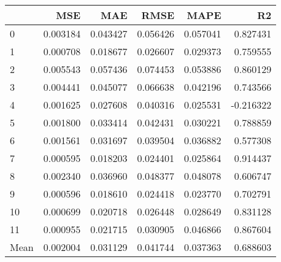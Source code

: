 \begin{tabular}{lrrrrr}
\toprule
 & MSE & MAE & RMSE & MAPE & R2 \\
\midrule
0 & 0.003184 & 0.043427 & 0.056426 & 0.057041 & 0.827431 \\
1 & 0.000708 & 0.018677 & 0.026607 & 0.029373 & 0.759555 \\
2 & 0.005543 & 0.057436 & 0.074453 & 0.053886 & 0.860129 \\
3 & 0.004441 & 0.045077 & 0.066638 & 0.042196 & 0.743566 \\
4 & 0.001625 & 0.027608 & 0.040316 & 0.025531 & -0.216322 \\
5 & 0.001800 & 0.033414 & 0.042431 & 0.030221 & 0.788859 \\
6 & 0.001561 & 0.031697 & 0.039504 & 0.036882 & 0.577308 \\
7 & 0.000595 & 0.018203 & 0.024401 & 0.025864 & 0.914437 \\
8 & 0.002340 & 0.036960 & 0.048377 & 0.048078 & 0.606747 \\
9 & 0.000596 & 0.018610 & 0.024418 & 0.023770 & 0.702791 \\
10 & 0.000699 & 0.020718 & 0.026448 & 0.028649 & 0.831128 \\
11 & 0.000955 & 0.021715 & 0.030905 & 0.046866 & 0.867604 \\
Mean & 0.002004 & 0.031129 & 0.041744 & 0.037363 & 0.688603 \\
\bottomrule
\end{tabular}

